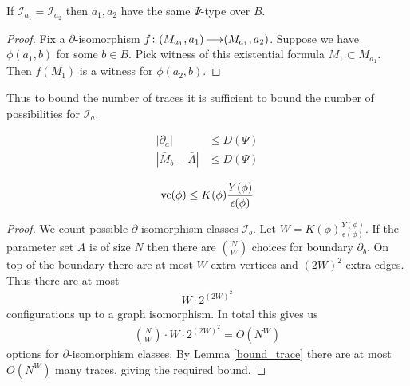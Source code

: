 \documentclass{amsart}
\newcommand{\II}{\mathscr I}
\begin{document}
\begin{Lemma} \label {bound_trace}
  If $\II_{a_1} = \II_{a_2}$ then $a_1, a_2$ have the same $\Psi$-type over $B$.
\end{Lemma}

\begin{proof}
  Fix a $\partial$-isomorphism $f \colon (\bar M_{a_1}, a_1) \operatorname{\longrightarrow} (\bar M_{a_1}, a_2)$.
  Suppose we have $\phi(a_1, b)$ for some $b \in B$.
  Pick witness of this existential formula $M_1 \subset \bar M_{a_1}$.
  Then $f(M_1)$ is a witness for  $\phi(a_2, b)$.
\end{proof}

Thus to bound the number of traces it is sufficient to bound the number of possibilities for $\II_a$.

\begin{Theorem} \label{main_bound}
  \begin{align*}
    |\partial_a| &\leq D(\Psi) \\ 
    |\bar M_b - \bar A| &\leq D(\Psi)
  \end{align*}
\end{Theorem}

\begin{Corollary}
  \begin{align*}
    \operatorname{vc}(\phi) \leq K(\phi) \frac{Y(\phi)}{\epsilon(\phi)}
  \end{align*}
\end{Corollary}

\begin{proof}
  We count possible $\partial$-isomorphism classes $\II_b$.
  Let $W = K(\phi) \frac{Y(\phi)}{\epsilon(\phi)}$.
  If the parameter set $A$ is of size $N$ then there are $N \choose W$ choices for boundary $\partial_b$.
  On top of the boundary there are at most $W$ extra vertices and $(2W)^2$ extra edges.
  Thus there are at most
  \begin{align*}
    W \cdot 2^{(2W)^2}
  \end{align*}
  configurations up to a graph isomorphism.
  In total this gives us 
  \begin{align*}
    {N \choose W} \cdot W \cdot 2^{(2W)^2} = O(N^W)
  \end{align*}
  options for $\partial$-isomorphism classes.
  By Lemma \ref{bound_trace} there are at most $O(N^W)$ many traces, giving the required bound.
\end{proof}
\end{document}
